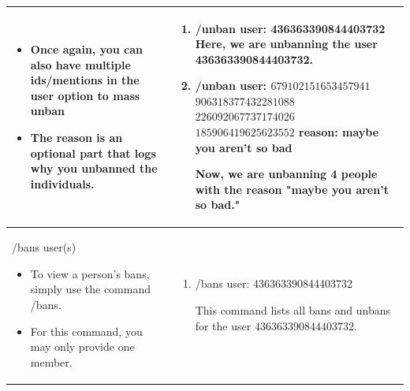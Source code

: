 \documentclass{scrartcl}
\begin{document}
\begin{tabularx}{\textwidth}{|>{\raggedright\arraybackslash}X|>{\raggedright\arraybackslash}X|}
\begin{itemize}
    \item Once again, you can also have multiple ids/mentions in the user option to mass unban
    
    \item The reason is an optional part that logs why you unbanned the individuals.
\end{itemize}&
\begin{enumerate}
    \item /unban \color{black} user: \color{gray} 436363390844403732 \color{black}
    Here, we are unbanning the user 436363390844403732.
    
    \item /unban \color{black} user: \color{gray} $679102151653457941$ $906318377432281088$ $226092067737174026$ $185906419625623552$ \color{black} reason: \color{gray} maybe you aren't so bad \color{black}
    
    Now, we are unbanning 4 people with the reason "maybe you aren't so bad."
\end{enumerate}
\\
\hline
/bans user(s)
\begin{itemize}
    \item To view a person's bans, simply use the command /bans.
    \item For this command, you may only provide one member.
\end{itemize}&
\begin{enumerate}
    \item /bans user: \color{gray}436363390844403732\color{black}
    
    This command lists all bans and unbans for the user $436363390844403732.$
\end{enumerate}\\
\hline
\end{tabularx}
\end{document}
